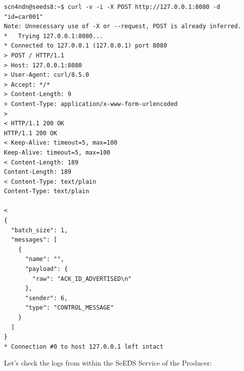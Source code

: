 \documentclass{article}
\begin{document}
\begin{lstlisting}[language=curl, caption={Publish \textit{@id=car001} to the NDN network through the Producer Node}, label={lst:publish-id-testbed}]
scn4ndn@seeds8:~$ curl -v -i -X POST http://127.0.0.1:8080 -d "id=car001"
Note: Unnecessary use of -X or --request, POST is already inferred.
*   Trying 127.0.0.1:8080...
* Connected to 127.0.0.1 (127.0.0.1) port 8080
> POST / HTTP/1.1
> Host: 127.0.0.1:8080
> User-Agent: curl/8.5.0
> Accept: */*
> Content-Length: 9
> Content-Type: application/x-www-form-urlencoded
> 
< HTTP/1.1 200 OK
HTTP/1.1 200 OK
< Keep-Alive: timeout=5, max=100
Keep-Alive: timeout=5, max=100
< Content-Length: 189
Content-Length: 189
< Content-Type: text/plain
Content-Type: text/plain

< 
{
  "batch_size": 1,
  "messages": [
    {
      "name": "",
      "payload": {
        "raw": "ACK_ID_ADVERTISED\n"
      },
      "sender": 6,
      "type": "CONTROL_MESSAGE"
    }
  ]
}
* Connection #0 to host 127.0.0.1 left intact 
\end{lstlisting}

Let's check the logs from within the SeEDS Service of the Producer: 
\end{document}
